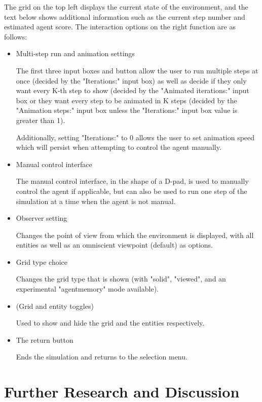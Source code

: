 \documentclass[masterthesis]{fer}
\begin{document}
The grid on the top left displays the current state of the environment,
and the text below shows additional information such as the current step number and estimated agent score.
The interaction options on the right function are as follows:
\begin{itemize}
\item{Multi-step run and animation settings}

The first three input boxes and button allow the user to run multiple steps at once (decided by the "Iterations:" input box) as well as decide if they only want every K-th step to show (decided by the "Animated iterations:" input box or they want every step to be animated in K steps (decided by the "Animation steps:" input box unless the "Iterations:" input box value is greater than 1).

Additionally, setting "Iterations:" to 0 allows the user to set animation speed which will persist when attempting to control the agent manually.

\item{Manual control interface}

The manual control interface, in the shape of a D-pad, is used to manually control the agent if applicable, but can also be used to run one step of the simulation at a time when the agent is not manual.

\item{Observer setting}

Changes the point of view from which the environment is displayed, with all entities as well as an omniscient viewpoint (default) as options.

\item{Grid type choice}

Changes the grid type that is shown (with "solid", "viewed", and an experimental "agentmemory" mode available).

\item(Grid and entity toggles)

Used to show and hide the grid and the entities respectively.

\item{The return button}

Ends the simulation and returns to the selection menu.
\end{itemize}

\chapter{Further Research and Discussion}
\label{sec:further_research_and_discussion}
\end{document}
